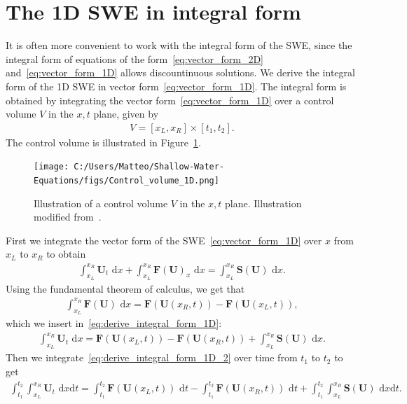 \section{The 1D SWE in integral form}
It is often more convenient to work with the integral form of the SWE, since the integral form of equations of the form~\eqref{eq:vector_form_2D} and~\eqref{eq:vector_form_1D} allows discountinuous solutions.
We derive the integral form of the 1D SWE in vector form~\eqref{eq:vector_form_1D}.
The integral form is obtained by integrating the vector form~\eqref{eq:vector_form_1D} over a control volume $V$ in the $x,t$ plane, given by
\begin{align*}
    V = [x_L, x_R] \times [t_1, t_2].
\end{align*}
The control volume is illustrated in Figure~\ref{fig:control_volume_1D}.
\begin{figure}[H]
    \centering
    \texttt{[image: C:/Users/Matteo/Shallow-Water-Equations/figs/Control\_volume\_1D.png]}
    \caption{Illustration of a control volume $V$ in the $x,t$ plane. Illustration modified from~\cite{Toro2024}.}\label{fig:control_volume_1D}
\end{figure}
First we integrate the vector form of the SWE~\eqref{eq:vector_form_1D} over $x$ from $x_L$ to $x_R$ to obtain
\begin{align}\label{eq:derive_integral_form_1D}
    \int_{x_L}^{x_R} \mathbf{U}_t \text{ d}x + \int_{x_L}^{x_R} \mathbf{F(U)}_x \text{ d}x = \int_{x_L}^{x_R} \mathbf{S(U)} \text{ d}x.
\end{align}
Using the fundamental theorem of calculus, we get that 
\begin{align*}
    \int_{x_L}^{x_R} \mathbf{F}(\mathbf{U}) \text{ d}x = \mathbf{F}(\mathbf{U}(x_R, t)) - \mathbf{F}(\mathbf{U}(x_L, t)),
\end{align*}
which we insert in~\eqref{eq:derive_integral_form_1D}:
\begin{align}\label{eq:derive_integral_form_1D_2}
    \int_{x_L}^{x_R} \mathbf{U}_t \text{ d}x = \mathbf{F}(\mathbf{U}(x_L, t)) - \mathbf{F}(\mathbf{U}(x_R, t)) + \int_{x_L}^{x_R} \mathbf{S(U)} \text{ d}x.
\end{align}
Then we integrate~\eqref{eq:derive_integral_form_1D_2} over time from $t_1$ to $t_2$ to get
\begin{align*}
    \int_{t_1}^{t_2} \int_{x_L}^{x_R} \mathbf{U}_t \text{ d}x \text{d}t = \int_{t_1}^{t_2} \mathbf{F}(\mathbf{U}(x_L, t)) \text{ d}t - \int_{t_1}^{t_2} \mathbf{F}(\mathbf{U}(x_R, t)) \text{ d}t + \int_{t_1}^{t_2} \int_{x_L}^{x_R} \mathbf{S(U)} \text{ d}x \text{d}t.
\end{align*}
